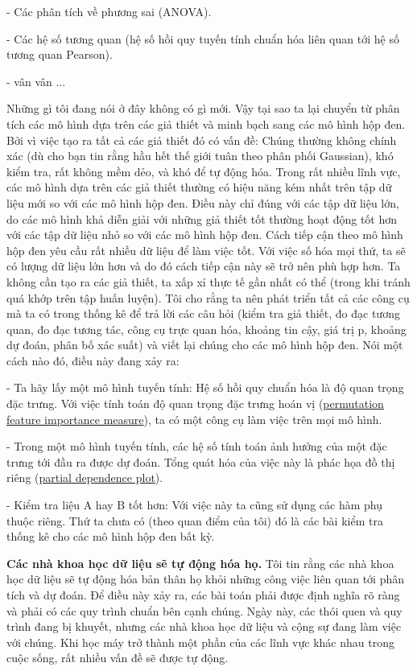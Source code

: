 - Các phân tích về phương sai (ANOVA).

- Các hệ số tương quan (hệ số hồi quy tuyến tính chuẩn hóa liên quan tới hệ số tương quan Pearson).

- vân vân ...

Những gì tôi đang nói ở đây không có gì mới. Vậy tại sao ta lại chuyển từ phân tích các mô hình dựa trên các giả thiết và  minh bạch sang các mô hình hộp đen. Bởi vì việc tạo ra tất cả các giả thiết đó có vấn đề: Chúng thường không chính xác (dù cho bạn tin rằng hầu hết thế giới tuân theo phân phối Gaussian), khó kiểm tra, rất không mềm dẻo, và khó để tự động hóa. Trong rất nhiều lĩnh vực, các mô hình dựa trên các giả thiết thường có hiệu năng kém nhất trên tập dữ liệu mới so với các mô hình hộp đen. Điều này chỉ đúng với các tập dữ liệu lớn, do các mô hình khả diễn giải với những giả thiết tốt thường hoạt động tốt hơn với các tập dữ liệu nhỏ so với các mô hình hộp đen. Cách tiếp cận theo mô hình hộp đen yêu cầu rất nhiều dữ liệu để làm việc tốt. Với việc số hóa mọi thứ, ta sẽ có lượng dữ liệu lớn hơn và do đó cách tiếp cận này sẽ trở nên phù hợp hơn. Ta không cần tạo ra các giả thiết, ta xấp xỉ thực tế gần nhất có thể (trong khi tránh quá khớp trên tập huấn luyện). Tôi cho rằng ta nên phát triển tất cả các công cụ mà ta có trong thống kê để trả lời các câu hỏi (kiểm tra giả thiết, đo đạc tương quan, đo đạc tương tác, công cụ trực quan hóa, khoảng tin cậy, giá trị p, khoảng dự đoán, phân bố xác suất) và viết lại chúng cho các mô hình hộp đen. Nói một cách nào đó, điều này đang xảy ra:

- Ta hãy lấy một mô hình tuyến tính: Hệ số hồi quy chuẩn hóa là độ quan trọng đặc trưng. Với việc tính toán độ quan trọng đặc trưng hoán vị (\href{https://christophm.github.io/interpretable-ml-book/feature-importance.html}{permutation feature importance measure}), ta có một công cụ làm việc trên mọi mô hình.

- Trong một mô hình tuyến tính, các hệ số tính toán ảnh hưởng của một đặc trưng tới đầu ra được dự đoán. Tổng quát hóa của việc này là phác họa đồ thị riêng (\href{https://christophm.github.io/interpretable-ml-book/pdp.html}{partial dependence plot}).

- Kiểm tra liệu A hay B tốt hơn: Với việc này ta cũng sử dụng các hàm phụ thuộc riêng. Thứ ta chưa có (theo quan điểm của tôi) đó là các bài kiểm tra thống kê cho các mô hình hộp đen bất kỳ.

\textbf{Các nhà khoa học dữ liệu sẽ tự động hóa họ.}
Tôi tin rằng các nhà khoa học dữ liệu sẽ tự động hóa bản thân họ khỏi những công việc liên quan tới phân tích và dự đoán. Để điều này xảy ra, các bài toán phải được định nghĩa rõ ràng và phải có các quy trình chuẩn bên cạnh chúng. Ngày này, các thói quen và quy trình đang bị khuyết, nhưng các nhà khoa học dữ liệu và cộng sự đang làm việc với chúng. Khi học máy trở thành một phần của các lĩnh vực khác nhau trong cuộc sống, rất nhiều vấn đề sẽ được tự động.

